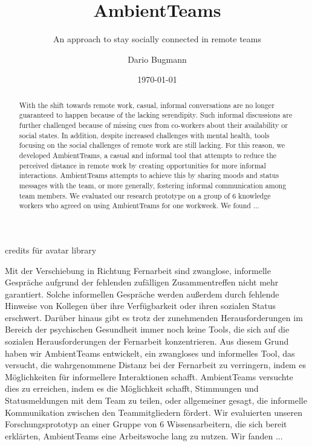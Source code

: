 \documentclass{seal_thesis}
\date{\today}
\title{AmbientTeams}
\subtitle{An approach to stay socially connected in remote teams}
\author{Dario Bugmann}
\begin{document}
\maketitle

\frontmatter

\begin{acknowledgements}
    credits für avatar library
\end{acknowledgements}

\begin{abstract}
    With the shift towards remote work, casual, informal conversations are no longer guaranteed to happen because of the lacking serendipity. Such informal discussions are further challenged because of missing cues from co-workers about their availability or social states. In addition, despite increased challenges with mental health, tools focusing on the social challenges of remote work are still lacking. For this reason, we developed AmbientTeams, a casual and informal tool that attempts to reduce the perceived distance in remote work by creating opportunities for more informal interactions. AmbientTeams attempts to achieve this by sharing moods and status messages with the team, or more generally, fostering informal communication among team members. We evaluated our research prototype on a group of 6 knowledge workers who agreed on using AmbientTeams for one workweek.
    We found ...

\end{abstract}

\begin{zusammenfassung}
    Mit der Verschiebung in Richtung Fernarbeit sind zwanglose, informelle Gespräche aufgrund der fehlenden zufälligen Zusammentreffen nicht mehr garantiert. Solche informellen Gespräche werden außerdem durch fehlende Hinweise von Kollegen über ihre Verfügbarkeit oder ihren sozialen Status erschwert. Darüber hinaus gibt es trotz der zunehmenden Herausforderungen im Bereich der psychischen Gesundheit immer noch keine Tools, die sich auf die sozialen Herausforderungen der Fernarbeit konzentrieren. Aus diesem Grund haben wir AmbientTeams entwickelt, ein zwangloses und informelles Tool, das versucht, die wahrgenommene Distanz bei der Fernarbeit zu verringern, indem es Möglichkeiten für informellere Interaktionen schafft. AmbientTeams versuchte dies zu erreichen, indem es die Möglichkeit schafft, Stimmungen und Statusmeldungen mit dem Team zu teilen, oder allgemeiner gesagt, die informelle Kommunikation zwischen den Teammitgliedern fördert. Wir evaluierten unseren Forschungsprototyp an einer Gruppe von 6 Wissensarbeitern, die sich bereit erklärten, AmbientTeams eine Arbeitswoche lang zu nutzen.
    Wir fanden ...
\end{zusammenfassung}
\end{document}
